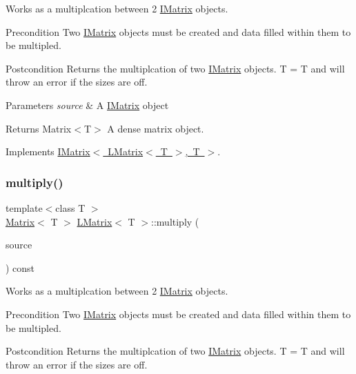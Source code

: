 Works as a multiplcation between 2 \mbox{\hyperlink{class_i_matrix}{I\+Matrix}} objects. 

\begin{DoxyPrecond}{Precondition}
Two \mbox{\hyperlink{class_i_matrix}{I\+Matrix}} objects must be created and data filled within them to be multipled. 
\end{DoxyPrecond}
\begin{DoxyPostcond}{Postcondition}
Returns the multiplcation of two \mbox{\hyperlink{class_i_matrix}{I\+Matrix}} objects. T = T and will throw an error if the sizes are off.
\end{DoxyPostcond}

\begin{DoxyParams}{Parameters}
{\em source} & A \mbox{\hyperlink{class_i_matrix}{I\+Matrix}} object \\
\hline
\end{DoxyParams}
\begin{DoxyReturn}{Returns}
Matrix$<$\+T$>$ A dense matrix object. 
\end{DoxyReturn}


Implements \mbox{\hyperlink{class_i_matrix_aa4d4f7ce2daec7d68ff8fd590652544d}{I\+Matrix$<$ L\+Matrix$<$ T $>$, T $>$}}.

\mbox{\label{class_l_matrix_afac5ae0da5f4ef8a2d442002d3e8336e}} 
\subsubsection{\texorpdfstring{multiply()}{multiply()}\hspace{0.1cm}{\footnotesize\ttfamily [4/6]}}
{\footnotesize\ttfamily template$<$class T $>$ \\
\mbox{\hyperlink{class_matrix}{Matrix}}$<$ T $>$ \mbox{\hyperlink{class_l_matrix}{L\+Matrix}}$<$ T $>$\+::multiply (\begin{DoxyParamCaption}\item[{const \mbox{\hyperlink{class_i_matrix}{I\+Matrix}}$<$ \mbox{\hyperlink{class_u_matrix}{U\+Matrix}}$<$ T $>$, T $>$ \&}]{source }\end{DoxyParamCaption}) const}



Works as a multiplcation between 2 \mbox{\hyperlink{class_i_matrix}{I\+Matrix}} objects. 

\begin{DoxyPrecond}{Precondition}
Two \mbox{\hyperlink{class_i_matrix}{I\+Matrix}} objects must be created and data filled within them to be multipled. 
\end{DoxyPrecond}
\begin{DoxyPostcond}{Postcondition}
Returns the multiplcation of two \mbox{\hyperlink{class_i_matrix}{I\+Matrix}} objects. T = T and will throw an error if the sizes are off.
\end{DoxyPostcond}

